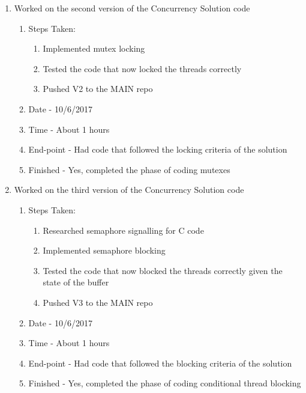 \documentclass[letterpaper,10pt,fleqn]{article}
\begin{document}
\begin{enumerate}
\begin{enumerate}
	\item Worked on the second version of the Concurrency Solution code
		\begin{enumerate}
			\item Steps Taken:
				\begin{enumerate}
					\item Implemented mutex locking
					\item Tested the code that now locked the threads correctly
					\item Pushed V2 to the MAIN repo
				\end{enumerate}
			\item Date - 10/6/2017
			\item Time - About 1 hours
			\item End-point - Had code that followed the locking criteria of the solution
			\item Finished - Yes, completed the phase of coding mutexes
		\end {enumerate}
		
	\item Worked on the third version of the Concurrency Solution code
		\begin{enumerate}
			\item Steps Taken:
				\begin{enumerate}
					\item Researched semaphore signalling for C code
					\item Implemented semaphore blocking
					\item Tested the code that now blocked the threads correctly given the state of the buffer
					\item Pushed V3 to the MAIN repo
				\end{enumerate}
			\item Date - 10/6/2017
			\item Time - About 1 hours
			\item End-point - Had code that followed the blocking criteria of the solution
			\item Finished - Yes, completed the phase of coding conditional thread blocking
		\end {enumerate}
		

\end{enumerate}
\end{enumerate}
\end{document}
